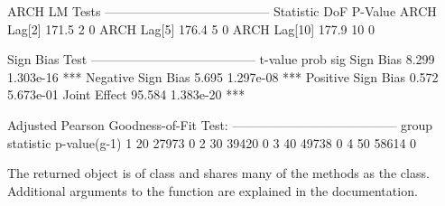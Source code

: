 \begin{Schunk}
\begin{Soutput}
ARCH LM Tests
---------------------------------------
             Statistic DoF P-Value
ARCH Lag[2]      171.5   2       0
ARCH Lag[5]      176.4   5       0
ARCH Lag[10]     177.9  10       0


Sign Bias Test
---------------------------------------
                   t-value      prob sig
Sign Bias            8.299 1.303e-16 ***
Negative Sign Bias   5.695 1.297e-08 ***
Positive Sign Bias   0.572 5.673e-01
Joint Effect        95.584 1.383e-20 ***


Adjusted Pearson Goodness-of-Fit Test:
---------------------------------------
  group statistic p-value(g-1)
1    20     27973            0
2    30     39420            0
3    40     49738            0
4    50     58614            0
\end{Soutput}
\end{Schunk}
The returned object is of class \verb@uGARCHfilter@ and shares many of the methods
as the \verb@uGARCHfit@ class. Additional arguments to the function are explained
in the documentation.

